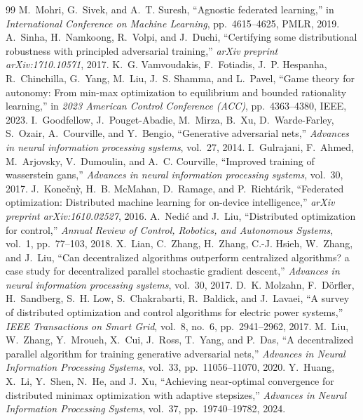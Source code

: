 \documentclass[10pt,a4paper]{amsart}
\begin{document}
\begin{thebibliography}{99}
 M.~Mohri, G.~Sivek, and A.~T. Suresh, ``Agnostic federated learning,'' in {\em International Conference on Machine Learning}, pp.~4615--4625, PMLR, 2019.
 A.~Sinha, H.~Namkoong, R.~Volpi, and J.~Duchi, ``Certifying some distributional robustness with principled adversarial training,'' {\em arXiv preprint arXiv:1710.10571}, 2017.
 K.~G. Vamvoudakis, F.~Fotiadis, J.~P. Hespanha, R.~Chinchilla, G.~Yang, M.~Liu, J.~S. Shamma, and L.~Pavel, ``Game theory for autonomy: From min-max optimization to equilibrium and bounded rationality learning,'' in {\em 2023 American Control Conference (ACC)}, pp.~4363--4380, IEEE, 2023.
 I.~Goodfellow, J.~Pouget-Abadie, M.~Mirza, B.~Xu, D.~Warde-Farley, S.~Ozair, A.~Courville, and Y.~Bengio, ``Generative adversarial nets,'' {\em Advances in neural information processing systems}, vol.~27, 2014.
 I.~Gulrajani, F.~Ahmed, M.~Arjovsky, V.~Dumoulin, and A.~C. Courville, ``Improved training of wasserstein gans,'' {\em Advances in neural information processing systems}, vol.~30, 2017.
 J.~Kone{\v{c}}n{\`y}, H.~B. McMahan, D.~Ramage, and P.~Richt{\'a}rik, ``Federated optimization: Distributed machine learning for on-device intelligence,'' {\em arXiv preprint arXiv:1610.02527}, 2016.
 A.~Nedi{\'c} and J.~Liu, ``Distributed optimization for control,'' {\em Annual Review of Control, Robotics, and Autonomous Systems}, vol.~1, pp.~77--103, 2018.
 X.~Lian, C.~Zhang, H.~Zhang, C.-J. Hsieh, W.~Zhang, and J.~Liu, ``Can decentralized algorithms outperform centralized algorithms? a case study for decentralized parallel stochastic gradient descent,'' {\em Advances in neural information processing systems}, vol.~30, 2017.
 D.~K. Molzahn, F.~D{\"o}rfler, H.~Sandberg, S.~H. Low, S.~Chakrabarti, R.~Baldick, and J.~Lavaei, ``A survey of distributed optimization and control algorithms for electric power systems,'' {\em IEEE Transactions on Smart Grid}, vol.~8, no.~6, pp.~2941--2962, 2017.
 M.~Liu, W.~Zhang, Y.~Mroueh, X.~Cui, J.~Ross, T.~Yang, and P.~Das, ``A decentralized parallel algorithm for training generative adversarial nets,'' {\em Advances in Neural Information Processing Systems}, vol.~33, pp.~11056--11070, 2020.
 Y.~Huang, X.~Li, Y.~Shen, N.~He, and J.~Xu, ``Achieving near-optimal convergence for distributed minimax optimization with adaptive stepsizes,'' {\em Advances in Neural Information Processing Systems}, vol.~37, pp.~19740--19782, 2024.

\end{thebibliography}
\end{document}
